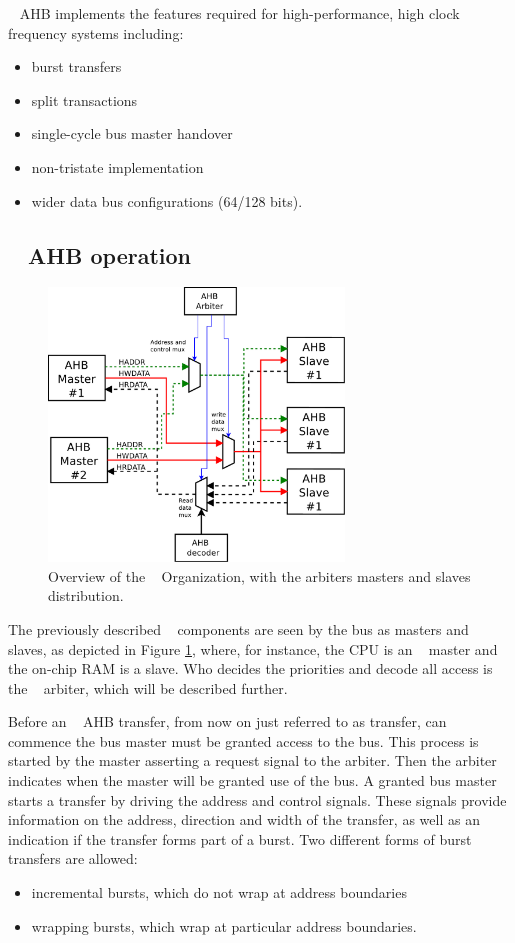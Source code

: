 \amba~ AHB implements the features required for high-performance, high clock
frequency systems including:
\begin{itemize}
 \item {burst transfers}
\item {split transactions}
\item {single-cycle bus master handover}
\item {non-tristate implementation}
\item {wider data bus configurations (64/128 bits).}
\end{itemize}

 
\subsection{\amba~ AHB operation}

\begin{figure}[!ht]
    \centering
    \includegraphics[width=0.7\textwidth]{figures/pdf/amba2_arbiter.pdf}
    \caption{Overview  of the \amba~ Organization, with the arbiters masters and slaves distribution.}
    \label{fig:internorg}
\end{figure}

The previously described \amba~ components are seen by the bus as masters and slaves, as depicted in Figure \ref{fig:internorg}, where, for instance, the CPU is an \amba~ master and the on-chip RAM is a slave. Who decides the priorities and decode all access is the \amba~ arbiter, which will be described further.

Before an \amba~ AHB transfer, from now on just referred to as transfer, can commence the bus master must be granted access to the bus. This process is started by the master asserting a request signal to the arbiter. Then the arbiter indicates when the master will be granted use of the bus. A granted bus master starts a transfer by driving the address and control signals. These signals provide information on the address, direction and width of the transfer, as well as an indication if the transfer forms part of a burst. Two different forms of burst transfers are allowed:
\begin{itemize}
\item incremental bursts, which do not wrap at address boundaries
\item wrapping bursts, which wrap at particular address boundaries.
\end{itemize}

